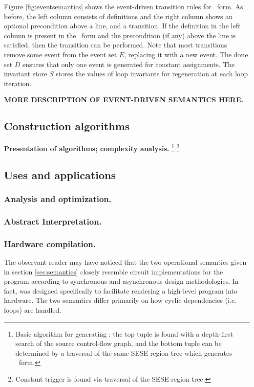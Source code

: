 \documentclass[12pt,notitlepage,twoside]{article}
\begin{document}
Figure \ref{fig:eventsemantics} shows the event-driven transition
rules for \ssiplus\ form.  As before, the left column consists of
definitions and the right column shows an optional precondition above
a line, and a transition.  If the definition in the left column is
present in the \ssiplus\ form and the precondition (if any) above the
line is satisfied, then the transition can be performed.  Note that
most transitions remove some event from the event set $E$, replacing
it with a new event.  The done set $D$ ensures that only one event is
generated for constant assignments.  The invariant store $S$ stores
the values of loop invariants for regeneration at each loop iteration.

\textbf{MORE DESCRIPTION OF EVENT-DRIVEN SEMANTICS HERE.}

\subsection{Construction algorithms}
\textbf{Presentation of algorithms; complexity analysis.}
\footnote{Basic algorithm for generating : the top
tuple is found with a depth-first search of the source
control-flow graph, and the bottom tuple can be determined by a
traversal of the same SESE-region tree which generates \ssizero\
form.}
\footnote{Constant trigger is found via traversal of the SESE-region tree.}

\subsection{Uses and applications}
\subsubsection{Analysis and optimization.}
\subsubsection{Abstract Interpretation.}
\subsubsection{Hardware compilation.}\label{sec:hardware}
The observant reader may have noticed that the two 
operational semantics given in section \ref{sec:semantics} closely
resemble circuit implementations for the program according to
synchronous and asynchronous design methodologies.  In fact,
\ssiplus{} was designed specifically to facilitate rendering a
high-level program into hardware.  The two semantics differ primarily
on how cyclic dependencies (i.e. loops) are handled.
\end{document}
